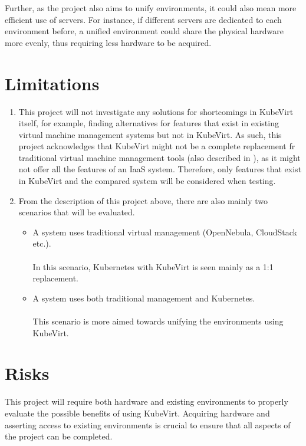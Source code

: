 \documentclass{article}
\begin{document}
Further, as the project also aims to unify environments, it could also mean more efficient use of servers. For instance, if different servers are dedicated to each environment before, a unified environment could share the physical hardware more evenly, thus requiring less hardware to be acquired. 

\section{Limitations}
\begin{enumerate}
    \item This project will not investigate any solutions for shortcomings in KubeVirt itself, for example, finding alternatives for features that exist in existing virtual machine management systems but not in KubeVirt. As such, this project acknowledges that KubeVirt might not be a complete replacement fr traditional virtual machine management tools (also described in \cite{kupenstack}), as it might not offer all the features of an IaaS system. Therefore, only features that exist in KubeVirt and the compared system will be considered when testing. 
    \item From the description of this project above, there are also mainly two scenarios that will be evaluated. 
    \begin{itemize}
        \item A system uses traditional virtual management (OpenNebula, CloudStack etc.). \\
        \\
        In this scenario, Kubernetes with KubeVirt is seen mainly as a 1:1 replacement.\\ 
        \item A system uses both traditional management and Kubernetes. \\
        \\
        This scenario is more aimed towards unifying the environments using KubeVirt. \\
    \end{itemize}
\end{enumerate}

\section{Risks}
This project will require both hardware and existing environments to properly evaluate the possible benefits of using KubeVirt. Acquiring hardware and asserting access to existing environments is crucial to ensure that all aspects of the project can be completed. 
\end{document}

